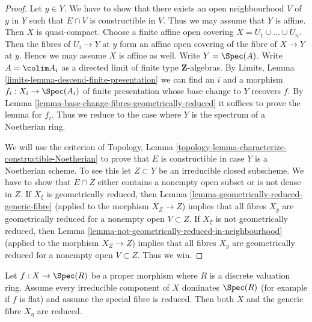 \begin{proof}
Let $y \in Y$. We have to show that there exists an open neighbourhood
$V$ of $y$ in $Y$ such that $E \cap V$ is constructible in $V$. Thus we may
assume that $Y$ is affine. Then $X$ is quasi-compact.
Choose a finite affine open covering $X = U_1 \cup \ldots \cup U_n$.
Then the fibres of $U_i \to Y$ at $y$ form an affine open covering
of the fibre of $X \to Y$ at $y$. Hence we may assume $X$ is affine
as well.  Write $Y = \Spec(A)$.
Write $A = \colim A_i$ as a directed limit of finite type
$\mathbf{Z}$-algebras. By
Limits, Lemma \ref{limits-lemma-descend-finite-presentation}
we can find an $i$ and a morphism $f_i : X_i \to \Spec(A_i)$ of
finite presentation whose base change to $Y$ recovers $f$. By
Lemma \ref{lemma-base-change-fibres-geometrically-reduced}
it suffices to prove the lemma for $f_i$. Thus we reduce to
the case where $Y$ is the spectrum of a Noetherian ring.

\medskip\noindent
We will use the criterion of
Topology, Lemma \ref{topology-lemma-characterize-constructible-Noetherian}
to prove that $E$ is constructible in case $Y$ is a Noetherian scheme.
To see this let $Z \subset Y$ be an irreducible closed subscheme.
We have to show that $E \cap Z$ either contains a nonempty open subset
or is not dense in $Z$. If $X_\xi$ is geometrically reduced, then
Lemma \ref{lemma-geometrically-reduced-generic-fibre}
(applied to the morphism $X_Z \to Z$)
implies that all fibres $X_y$ are geometrically reduced
for a nonempty open $V \subset Z$.
If $X_\xi$ is not geometrically reduced, then
Lemma \ref{lemma-not-geometrically-reduced-in-neighbourhood}
(applied to the morphism $X_Z \to Z$)
implies that all fibres $X_y$ are geometrically reduced
for a nonempty open $V \subset Z$. Thus we win.
\end{proof}

\begin{lemma}
\label{lemma-proper-flat-over-dvr-reduced-fibre}
Let $f : X \to \Spec(R)$ be a proper morphism where $R$ is a
discrete valuation ring. Assume every irreducible component
of $X$ dominates $\Spec(R)$ (for example if $f$ is flat) and
assume the special fibre is reduced. Then
both $X$ and the generic fibre $X_\eta$ are reduced.
\end{lemma}

